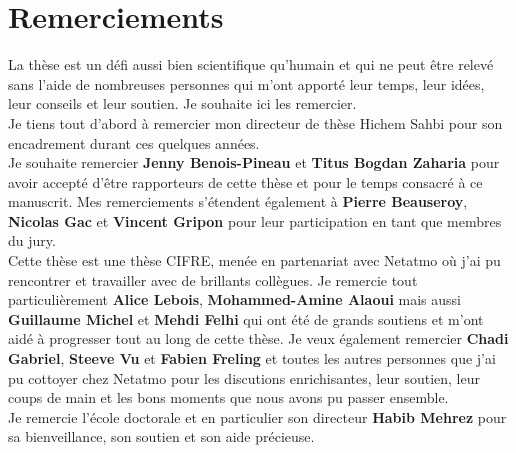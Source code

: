\chapter*{Remerciements}

\indent La thèse est un défi aussi bien scientifique qu'humain et qui ne peut
être relevé sans l'aide de nombreuses personnes qui m'ont apporté leur temps, leur idées,
leur conseils et leur soutien. Je souhaite ici les remercier.\\

Je tiens tout d'abord à remercier mon directeur de thèse Hichem Sahbi pour son
encadrement durant ces quelques années.\\

Je souhaite remercier \textbf{Jenny Benois-Pineau} et \textbf{Titus Bogdan
Zaharia} pour avoir accepté d'être rapporteurs de cette thèse et pour le temps
consacré à ce manuscrit. Mes remerciements s'étendent également à \textbf{Pierre
Beauseroy}, \textbf{Nicolas Gac} et \textbf{Vincent Gripon} pour leur
participation en tant que
membres du jury.\\

Cette thèse est une thèse CIFRE, menée en partenariat avec Netatmo où j'ai pu
rencontrer et travailler avec de brillants collègues. Je remercie tout
particulièrement \textbf{Alice Lebois}, \textbf{Mohammed-Amine Alaoui} mais
aussi \textbf{Guillaume Michel} et \textbf{Mehdi Felhi} qui ont été de grands
soutiens et m'ont aidé à progresser tout au long de cette thèse. Je veux
également remercier \textbf{Chadi Gabriel}, \textbf{Steeve Vu} et \textbf{Fabien
Freling} et toutes les autres personnes que j'ai pu cottoyer chez Netatmo pour
les discutions enrichisantes, leur soutien, leur coups de main et les bons
moments que nous avons pu passer ensemble.\\

Je remercie l'école doctorale et en particulier son directeur \textbf{Habib
Mehrez} pour sa bienveillance, son soutien et son aide précieuse.\\

